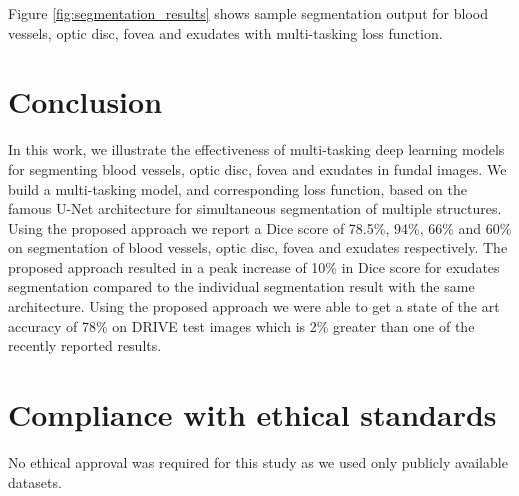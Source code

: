 \documentclass{article}
\begin{document}
Figure \ref{fig:segmentation_results} shows sample segmentation output for  blood vessels, optic disc, fovea and exudates with multi-tasking loss function.

\section{Conclusion}
In this work, we illustrate the effectiveness of multi-tasking deep learning models for segmenting blood vessels, optic disc, fovea and exudates in fundal images.
We build a multi-tasking model, and corresponding loss function,  based on the famous U-Net architecture for simultaneous  segmentation of multiple structures.
Using the proposed approach we report a Dice score of 78.5\%, 94\%, 66\% and 60\% on segmentation of blood vessels, optic disc, fovea and exudates respectively.
The proposed approach resulted in  a peak increase of 10\% in Dice score for exudates segmentation compared to the individual segmentation result with the same architecture.
Using the proposed approach we were able to get a state of the art accuracy of 78\% on DRIVE test images which is 2\% greater than one of the recently reported results.

\section{Compliance with ethical standards}
\label{sec:ethics}
No ethical approval was required for this study as we used only publicly available datasets.


\end{document}
